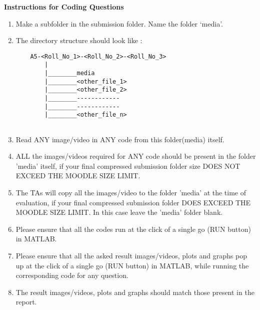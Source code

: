 \documentclass[11pt]{article}
\begin{document}
\noindent\textbf{Instructions for Coding Questions}
\begin{enumerate}
  \item Make a subfolder in the submission folder. Name the folder `media'.
  \item The directory structure should look like :
  \begin{verbatim}
    A5-<Roll_No_1>-<Roll_No_2>-<Roll_No_3>
        |	
        |________media
        |________<other_file_1>
        |________<other_file_2>
        |________------------
        |________------------
        |________<other_file_n>
        
  \end{verbatim}
  
  \item Read ANY image/video	in ANY code from this folder(media) itself.
  
  \item ALL the images/videos required for ANY code should be present in the folder 'media' itself, if your  final compressed submission folder size DOES NOT EXCEED THE MOODLE SIZE LIMIT.
  
  \item The TAs will copy all the images/video to the folder 'media' at the time of evaluation, if your final compressed submission folder DOES EXCEED THE MOODLE SIZE LIMIT. In this case leave the 'media' folder blank.
  
  \item Please ensure that all the codes run at the click of a single go (RUN button) in MATLAB.
  
  \item Please ensure that all the asked result images/videos, plots and graphs pop up at the click of a single go (RUN button) in MATLAB, while running the corresponding code for any question.
  
  \item The result images/videos, plots and graphs should match those present in the report.

\end{enumerate}
\end{document}

